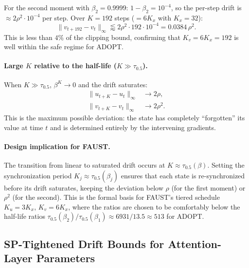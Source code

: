 \documentclass{article}
\begin{document}
For the second moment with $\beta_2 = 0.9999$:
$1 - \beta_2 = 10^{-4}$, so the per-step drift is
$\approx 2\rho^2 \cdot 10^{-4}$ per step. Over $K = 192$ steps
($= 6K_x$ with $K_x = 32$):
\begin{equation}
\|v_{t+192} - v_t\|_\infty
\lessapprox 2\rho^2 \cdot 192 \cdot 10^{-4}
= 0.0384\,\rho^2.
\label{eq:drift_v_concrete}
\end{equation}
This is less than $4\%$ of the clipping bound, confirming that
$K_v = 6K_x = 192$ is well within the safe regime for ADOPT.

\paragraph{Large $K$ relative to the half-life ($K \gg \tau_{0.5}$).}

When $K \gg \tau_{0.5}$, $\beta^K \to 0$ and the drift saturates:
\begin{align}
\|u_{t+K} - u_t\|_\infty &\to 2\rho,
\label{eq:drift_u_saturate} \\
\|v_{t+K} - v_t\|_\infty &\to 2\rho^2.
\label{eq:drift_v_saturate}
\end{align}
This is the maximum possible deviation: the state has completely
``forgotten'' its value at time $t$ and is determined entirely by the
intervening gradients.

\paragraph{Design implication for FAUST.}
The transition from linear to saturated drift occurs at
$K \approx \tau_{0.5}(\beta)$. Setting the synchronization period
$K_j \approx \tau_{0.5}(\beta_j)$ ensures that each state is
re-synchronized before its drift saturates, keeping the deviation
below $\rho$ (for the first moment) or $\rho^2$ (for the second).
This is the formal basis for FAUST's tiered schedule
$K_u = 3K_x$, $K_v = 6K_x$, where the ratios are chosen to be
comfortably below the half-life ratios
$\tau_{0.5}(\beta_2)/\tau_{0.5}(\beta_1) \approx 6931/13.5 \approx 513$
for ADOPT.

\subsection{SP-Tightened Drift Bounds for Attention-Layer Parameters}
\label{sec:drift_sp_tightened}
\end{document}
